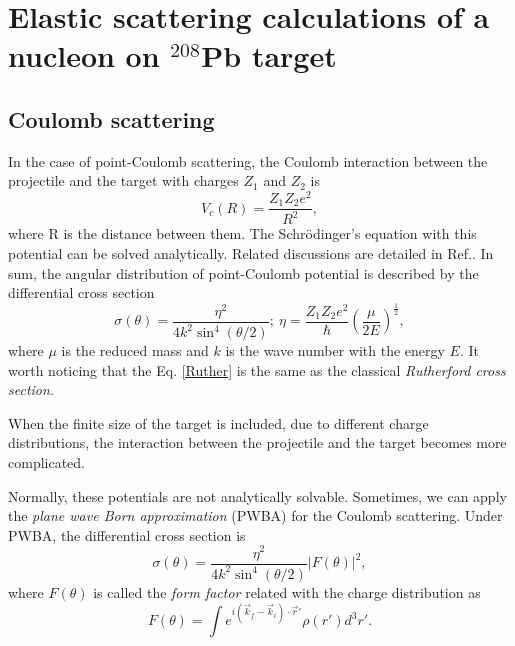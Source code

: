 \section{Elastic scattering calculations of a nucleon on $^{208}$Pb target} \label{part1}
\subsection{Coulomb scattering}
	In the case of point-Coulomb scattering, the Coulomb interaction between the projectile and the target with charges $Z_1$ and $Z_2$ is 
	\begin{equation}
		V_c(R)=\frac{Z_1Z_2e^2}{R^2},
	\end{equation}
	where R is the distance between them. The Schr\"{o}dinger's equation with this potential can be solved analytically. Related discussions are detailed in Ref.\cite{thompson2009nuclear}. In sum, the angular distribution of point-Coulomb potential is described by the differential cross section
	\begin{equation}\label{Ruther}
		\sigma(\theta)=\frac{\eta^2}{4k^2\sin^4(\theta/2)};\ \eta=\frac{Z_1Z_2e^2}{\hbar}\left(\frac{\mu}{2E}\right)^{\frac{1}{2}},
	\end{equation} 
	where $\mu$ is the reduced mass and $k$ is the wave number with the energy $E$. It worth noticing that the Eq. \ref{Ruther} is the same as the classical \emph{Rutherford cross section}.
	
	When the finite size of the target is included, due to different charge distributions, the interaction between the projectile and the target becomes more complicated. 
	
  	Normally, these potentials are not analytically solvable. Sometimes, we can apply the \emph{plane wave Born approximation} (PWBA) for the Coulomb scattering. Under PWBA, the differential cross section is 
  	\begin{equation}\label{ruther}
	\sigma(\theta)=\frac{\eta^2}{4k^2\sin^4(\theta/2)}\left|F(\theta)\right|^2,\end{equation}
	where $F(\theta)$ is called the \emph{form factor} related with the charge distribution as
	\begin{equation}\label{formfactor}
	F(\theta) = \int e^{i(\vec{k}_f-\vec{k}_i)\cdot\vec{r}'}\rho(r')d^3r'.
	\end{equation}
	
